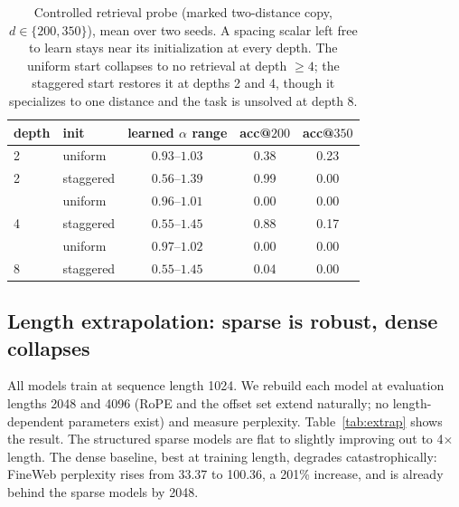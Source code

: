 \documentclass[11pt]{article}
\begin{document}
\begin{table}[htbp]
\centering
\small
\begin{tabular}{llccc}
\toprule
depth & init & learned $\alpha$ range & acc@$200$ & acc@$350$ \\
\midrule
2 & uniform   & $0.93$--$1.03$ & 0.38 & 0.23 \\
2 & staggered & $0.56$--$1.39$ & 0.99 & 0.00 \\
\addlinespace
4 & uniform   & $0.96$--$1.01$ & 0.00 & 0.00 \\
4 & staggered & $0.55$--$1.45$ & 0.88 & 0.17 \\
\addlinespace
8 & uniform   & $0.97$--$1.02$ & 0.00 & 0.00 \\
8 & staggered & $0.55$--$1.45$ & 0.04 & 0.00 \\
\bottomrule
\end{tabular}
\caption{Controlled retrieval probe (marked two-distance copy, $d\in\{200,350\}$),
mean over two seeds. A spacing scalar left free to learn stays near its
initialization at every depth. The uniform start collapses to no retrieval at depth
$\ge 4$; the staggered start restores it at depths 2 and 4, though it specializes
to one distance and the task is unsolved at depth 8.}
\label{tab:probe}
\end{table}

\subsection{Length extrapolation: sparse is robust, dense collapses}
\label{sec:extrap}

All models train at sequence length 1024. We rebuild each model at evaluation
lengths 2048 and 4096 (RoPE and the offset set extend naturally; no
length-dependent parameters exist) and measure perplexity.
Table~\ref{tab:extrap} shows the result. The structured sparse models are flat to
slightly improving out to 4$\times$ length. The dense baseline, best at training
length, degrades catastrophically: FineWeb perplexity rises from 33.37 to 100.36,
a 201\% increase, and is already behind the sparse models by 2048.
\end{document}
